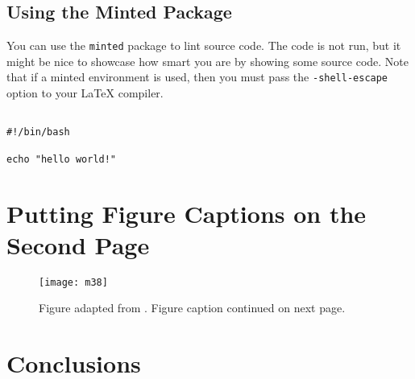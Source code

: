 \documentclass[PhD]{dukethesis}
\begin{document}
\section{Using the Minted Package}

You can use the \texttt{minted} package to lint source code. The code is not
run, but it might be nice to showcase how smart you are by showing some source
code. Note that if a minted environment is used, then you must pass the
\texttt{-shell-escape} option to your LaTeX compiler.

\lipsum[1]

\begin{singlespace}
\begin{verbatim}

#!/bin/bash

echo "hello world!"

\end{verbatim}
\end{singlespace}



\chapter{Putting Figure Captions on the Second Page}
\label{chap:04}

\begin{figure}[ht] 
	\begin{center}
		\texttt{[image: m38]}
			\caption[This is a figure caption.]{Figure adapted from
			\cite{Courtland2021}. Figure caption continued on next page.}
		\label{fig:m38}
	\end{center}
\end{figure}

\begin{figure}[t]
		\contcaption{\lipsum[3]}
\end{figure}



\chapter{Conclusions}

\lipsum[1-3]



\startbibliography{}

\begin{singlespace} %


\end{singlespace}



%
%


\end{document}

